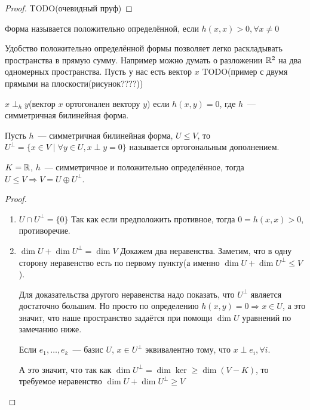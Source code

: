 \begin{proof}
    TODO(очевидный пруф)
\end{proof}
\begin{definition}
    Форма называется положительно определённой, если $h(x, x) > 0, \forall x\not=0$
\end{definition}
\begin{remark}
    Удобство положительно определённой формы позволяет легко раскладывать пространства в прямую сумму.
    Например можно думать о разложении  $\mathbb{R}^2$ на два одномерных пространства. Пусть у нас есть
    вектор $x$ TODO(пример с двумя прямыми на плоскости(рисунок????))
\end{remark}
\begin{definition}
    $x \perp_h y$(вектор $x$ ортогонален вектору $y$) если $h(x,y) = 0$, где $h$~--- симметричная 
    билинейная форма.
\end{definition}
\begin{definition}
    Пусть $h$~--- симметричная билинейная форма, $U\le V$, то $U^{\perp} = 
    \{x\in V \mid \forall y \in U, x\perp y = 0\}$ называется ортогональным дополнением.
\end{definition}
\begin{theorem}
    $K = \mathbb{R}$, $h$~--- симметричное и положительно определённое, тогда 
    $U \le V \Rightarrow V = U \oplus U^{\perp}$.
\end{theorem}
\begin{proof}\leavevmode
    \begin{enumerate}
        \item
        $U\cap U^{\perp} = \{0\}$
        Так как если предположить противное, тогда $0 = h(x,x) > 0$, противоречие.
        \item 
        $\dim U + \dim U^{\perp} = \dim V$
        Докажем два неравенства. Заметим, что в одну сторону неравенство есть
        по первому пункту(а именно $\dim U + \dim U^{\perp} \le V$).

        Для доказательства другого неравенства надо показать, что $U^{\perp}$ является достаточно
        большим. Но просто по определению $h(x, y) = 0 \Rightarrow x\in U$, а это значит, что наше
        пространство задаётся при помощи $\dim U$ уравнений по замечанию ниже.

        \begin{remark}
            Если $e_1,\dots, e_k$~--- базис $U$, 
            $x\in U^{\perp}$ эквивалентно тому, что $x \perp e_i, \forall i$.
        \end{remark}

        А это значит, что так как $\dim U^{\perp} = \dim \ker \ge \dim (V - K)$, то требуемое
        неравенство $\dim U + \dim U^{\perp} \ge V$
    \end{enumerate}
\end{proof}
